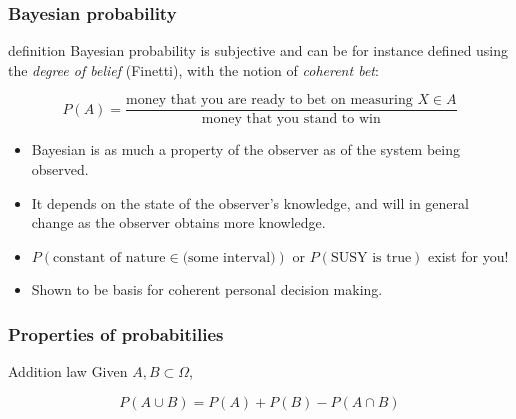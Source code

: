\documentclass[9pt]{beamer}
\begin{document}
\begin{frame}
 \frametitle{Bayesian probability}
 
 \begin{block}{definition}
  Bayesian probability is subjective and can be for instance defined using the \emph{degree of belief} (Finetti), with the notion of \emph{coherent bet}:
  
  $$P(A) = \frac{\text{money that you are ready to bet on measuring } X \in A}{\text{money that you stand to win}}$$
 \end{block}
 
 \begin{itemize}
  \item Bayesian is as much a property of the observer as of the system being observed.
  \item It depends on the state of the observer's knowledge, and will in general change as the observer obtains more knowledge.
  \item $P(\text{constant of nature} \in \text{(some interval)})$ or $P(\text{SUSY is true})$ exist for you!
  \item Shown to be basis for coherent personal decision making.
 \end{itemize}


\end{frame}

\begin{frame}
 \frametitle{Properties of probabitilies}
 
 \begin{block}{Addition law}
  Given $A, B \subset \Omega$, 
  
  $$P(A \cup B) = P(A) + P(B) - P(A \cap B)$$
 \end{block}
 


\end{frame}
\end{document}

